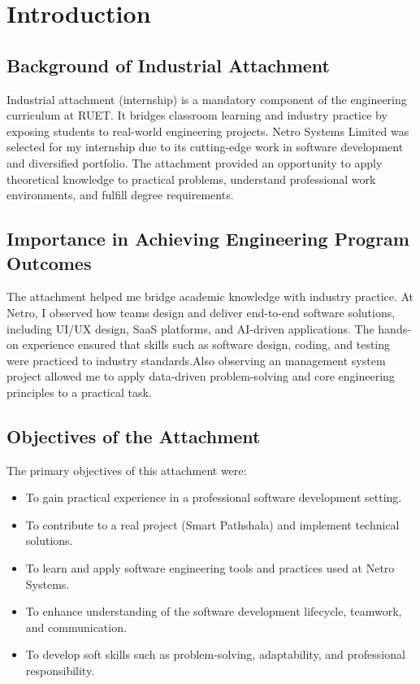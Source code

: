 \documentclass[12pt,a4paper]{report}
\let\oldcite\cite
\renewcommand{\cite}[1]{\textcolor{impactcolor}{\oldcite{#1}}}
\newenvironment{coloritemize}
{\begin{itemize}[label=\textcolor{primaryblue}{$\bullet$}]}
{\end{itemize}}
\begin{document}
\chapter{Introduction}
\section{Background of Industrial Attachment}
Industrial attachment (internship) is a mandatory component of the engineering curriculum at RUET. It bridges classroom learning and industry practice by exposing students to real-world engineering projects. Netro Systems Limited was selected for my internship due to its cutting-edge work in software development and diversified portfolio. The attachment provided an opportunity to apply theoretical knowledge to practical problems, understand professional work environments, and fulfill degree requirements.

\section{Importance in Achieving Engineering Program Outcomes}
The attachment helped me bridge academic knowledge with industry practice. At Netro,
I observed how teams design and deliver end-to-end software solutions, including UI/UX
design, SaaS platforms, and AI-driven applications. The hands-on experience ensured that skills such as software design, coding, and testing were practiced to industry standards.Also observing an management system project allowed me to apply data-driven
problem-solving and core engineering principles to a practical task. 

\section{Objectives of the Attachment}
The primary objectives of this attachment were:
\begin{coloritemize}
    \item To gain practical experience in a professional software development setting.
    \item To contribute to a real project (Smart Pathshala) and implement technical solutions.
    \item To learn and apply software engineering \cite{ref11} tools and practices used at Netro Systems.
    \item To enhance understanding of the software development lifecycle, teamwork, and communication.
    \item To develop soft skills such as problem-solving, adaptability, and professional responsibility.
\end{coloritemize}
\end{document}
